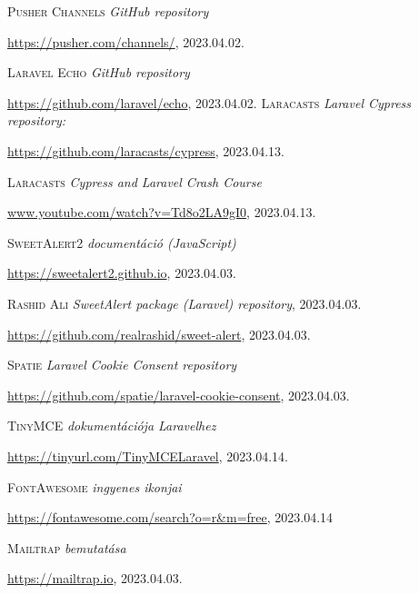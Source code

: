 \documentclass[
]{thesis-ekf}
\theoremstyle{definition}
\theoremstyle{remark}
\begin{document}
\begin{thebibliography}{2}
		\textsc{Pusher Channels}  \emph{GitHub repository} 
		
		\url{https://pusher.com/channels/}, 2023.04.02.

		\textsc{Laravel Echo}  \emph{GitHub repository} 
		
		\url{https://github.com/laravel/echo}, 2023.04.02.
        \textsc{Laracasts} \emph{Laravel Cypress repository:}

        \url{https://github.com/laracasts/cypress}, 2023.04.13.

        \textsc{Laracasts} \emph{Cypress and Laravel Crash Course}

        \url{www.youtube.com/watch?v=Td8o2LA9gI0}, 2023.04.13.
        
            \textsc{SweetAlert2} \emph{ documentáció (JavaScript)}

            \url{https://sweetalert2.github.io}, 2023.04.03.

            \textsc{Rashid Ali} \emph{SweetAlert package (Laravel) repository}, 2023.04.03.

            \url{https://github.com/realrashid/sweet-alert}, 2023.04.03.

   
            \textsc{Spatie} \emph{Laravel Cookie Consent repository} 

            \url{https://github.com/spatie/laravel-cookie-consent}, 2023.04.03.


            \textsc{TinyMCE} \emph{dokumentációja Laravelhez} 

            \url{https://tinyurl.com/TinyMCELaravel}, 2023.04.14.
            
        \textsc{FontAwesome} \emph{ingyenes ikonjai}

        \url{https://fontawesome.com/search?o=r&m=free}, 2023.04.14
        
        \textsc{Mailtrap} \emph{bemutatása} 

        \url{https://mailtrap.io}, 2023.04.03.

	\end{thebibliography}
    
\end{document}
